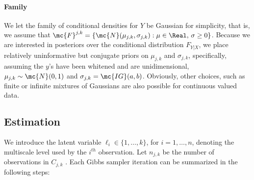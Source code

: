 \paragraph{Family} We let the family of conditional densities for $Y$ be Gaussian for simplicity, that is, we assume that $\mc{F}^{j,k}=\{\mc{N}(\mu_{j,k}, {\sigma}_{j,k}) : \mu \in \Real, \, \sigma \geq 0\}$. Because we are interested in posteriors over the conditional distribution $F_{Y|X}$, we place relatively uninformative but conjugate priors on $\mu_{j,k}$ and ${\sigma}_{j,k}$, specifically, assuming the $y$'s have been whitened and are unidimensional,  
${\mu}_{j,k} \sim \mc{N}(0,1)$ and ${\sigma}_{j,k}=\mc{IG}(a,b)$.  
Obviously, other choices, such as finite or infinite mixtures of Gaussians are also possible for continuous valued data.  




\subsection{Estimation}



We introduce the latent variable $\ell_i \in \{1,\ldots,k\}$, for $i=1,\ldots,n$, denoting the multiscale level used by the $i^{th}$ observation.  
Let $n_{j,k}$ be  the number of observations in $C_{j,k}$ . Each Gibbs sampler iteration can be summarized in the following steps:

